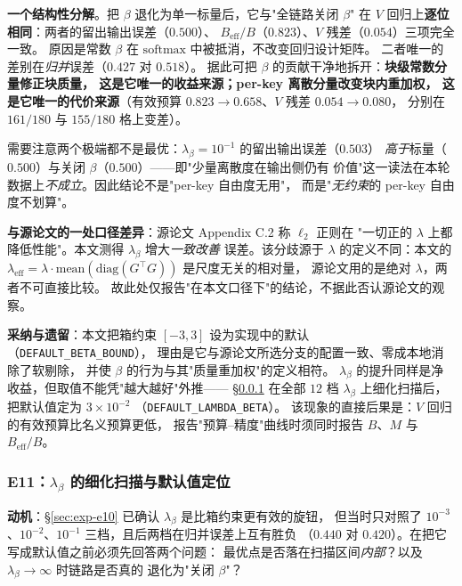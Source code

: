 \textbf{一个结构性分解}。把 $\beta$ 退化为单一标量后，它与"全链路关闭 $\beta$"
在 $V$ 回归上\textbf{逐位相同}：两者的留出输出误差（$0.500$）、
$B_{\text{eff}}/B$（$0.823$）、$V$ 残差（$0.054$）三项完全一致。
原因是常数 $\beta$ 在 $\mathrm{softmax}$ 中被抵消，不改变回归设计矩阵。
二者唯一的差别在\emph{归并}误差（$0.427$ 对 $0.518$）。
据此可把 $\beta$ 的贡献干净地拆开：\textbf{块级常数分量修正块质量，
这是它唯一的收益来源；per-key 离散分量改变块内重加权，
这是它唯一的代价来源}（有效预算 $0.823\to0.658$、$V$ 残差 $0.054\to0.080$，
分别在 $161/180$ 与 $155/180$ 格上变差）。

需要注意两个极端都不是最优：$\lambda_\beta=10^{-1}$ 的留出输出误差（$0.503$）
\emph{高于}标量（$0.500$）与关闭 $\beta$（$0.500$）——即"少量离散度在输出侧仍有
价值"这一读法在本轮数据上\emph{不成立}。因此结论不是"per-key 自由度无用"，
而是"\emph{无约束}的 per-key 自由度不划算"。

\textbf{与源论文的一处口径差异}：源论文 Appendix C.2 称 $\ell_2$ 正则在
"一切正的 $\lambda$ 上都降低性能"。本文测得 $\lambda_\beta$ 增大\emph{一致改善}
误差。该分歧源于 $\lambda$ 的定义不同：本文的 $\lambda_{\text{eff}}=
\lambda\cdot\mathrm{mean}(\mathrm{diag}(G^\top G))$ 是尺度无关的相对量，
源论文用的是绝对 $\lambda$，两者不可直接比较。
故此处仅报告"在本文口径下"的结论，不据此否认源论文的观察。

\textbf{采纳与遗留}：本文把箱约束 $[-3,3]$ 设为实现中的默认
（\texttt{DEFAULT\_}\allowbreak\texttt{BETA\_}\allowbreak\texttt{BOUND}），
理由是它与源论文所选分支的配置一致、零成本地消除了软剔除，
并使 $\beta$ 的行为与其"质量重加权"的定义相符。
$\lambda_\beta$ 的提升同样是净收益，但取值不能凭"越大越好"外推——
\S\ref{sec:exp-e11} 在全部 $12$ 档 $\lambda_\beta$ 上细化扫描后，
把默认值定为 $3\times10^{-2}$
（\texttt{DEFAULT\_}\allowbreak\texttt{LAMBDA\_}\allowbreak\texttt{BETA}）。
该现象的直接后果是：$V$ 回归的有效预算比名义预算更低，
报告"预算–精度"曲线时须同时报告 $B$、$M$ 与 $B_{\text{eff}}/B$。

\subsubsection{E11：$\lambda_\beta$ 的细化扫描与默认值定位}
\label{sec:exp-e11}

\textbf{动机}：\S\ref{sec:exp-e10} 已确认 $\lambda_\beta$ 是比箱约束更有效的旋钮，
但当时只对照了 $10^{-3}$、$10^{-2}$、$10^{-1}$ 三档，且后两档在归并误差上互有胜负
（$0.440$ 对 $0.420$）。在把它写成默认值之前必须先回答两个问题：
最优点是否落在扫描区间\emph{内部}？以及 $\lambda_\beta\to\infty$ 时链路是否真的
退化为"关闭 $\beta$"？

